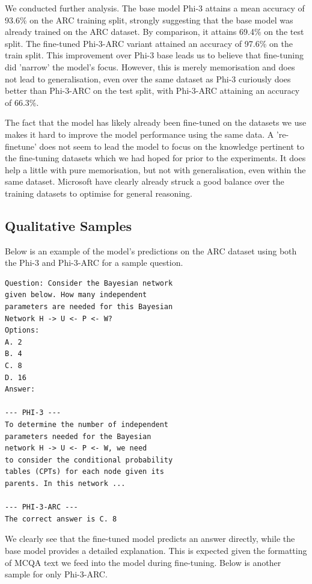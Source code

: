 We conducted further analysis. The base model Phi-3 attains a mean accuracy of 93.6\% on the ARC training split, strongly suggesting that the base model was already trained on the ARC dataset. By comparison, it attains 69.4\% on the test split. The fine-tuned Phi-3-ARC variant attained an accuracy of 97.6\% on the train split. This improvement over Phi-3 base leads us to believe that fine-tuning did 'narrow' the model's focus. However, this is merely memorisation and does not lead to generalisation, even over the same dataset as Phi-3 curiously does better than Phi-3-ARC on the test split, with Phi-3-ARC attaining an accuracy of 66.3\%.

The fact that the model has likely already been fine-tuned on the datasets we use makes it hard to improve the model performance using the same data. A 're-finetune' does not seem to lead the model to focus on the knowledge pertinent to the fine-tuning datasets which we had hoped for prior to the experiments. It does help a little with pure memorisation, but not with generalisation, even within the same dataset. Microsoft have clearly already struck a good balance over the training datasets to optimise for general reasoning.

\subsection{Qualitative Samples}
\label{subsec:qualitative-samples}

Below is an example of the model's predictions on the ARC dataset using both the Phi-3 and Phi-3-ARC for a sample question.

\begin{lstlisting}[caption={Sample Question}]
Question: Consider the Bayesian network 
given below. How many independent
parameters are needed for this Bayesian 
Network H -> U <- P <- W?
Options:
A. 2
B. 4
C. 8
D. 16
Answer:

--- PHI-3 ---
To determine the number of independent
parameters needed for the Bayesian
network H -> U <- P <- W, we need
to consider the conditional probability
tables (CPTs) for each node given its 
parents. In this network ...

--- PHI-3-ARC ---
The correct answer is C. 8
\end{lstlisting}

We clearly see that the fine-tuned model predicts an answer directly, while the base model provides a detailed explanation. This is expected given the formatting of MCQA text we feed into the model during fine-tuning. Below is another sample for only Phi-3-ARC.

